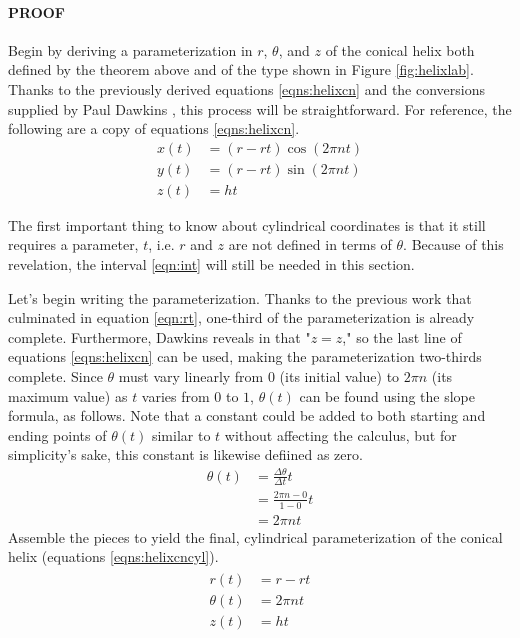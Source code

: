 \documentclass{article}
\begin{document}
\paragraph{PROOF} Begin by deriving a parameterization in $r$, $\theta$, and $z$ of the conical helix both defined by the theorem above and of the type shown in Figure \ref{fig:helixlab}. Thanks to the previously derived equations \ref{eqns:helixcn} and the conversions supplied by Paul Dawkins \cite{Bib:cylcords}, this process will be straightforward. For reference, the following are a copy of equations \ref{eqns:helixcn}.
\begin{align*}
    x(t) &= (r-rt)\cos(2\pi nt)\\
    y(t) &= (r-rt)\sin(2\pi nt)\\
    z(t) &= ht
\end{align*}\par
The first important thing to know about cylindrical coordinates is that it still requires a parameter, $t$, i.e. $r$ and $z$ are not defined in terms of $\theta$. Because of this revelation, the interval \ref{eqn:int} will still be needed in this section.\par
Let's begin writing the parameterization. Thanks to the previous work that culminated in equation \ref{eqn:rt}, one-third of the parameterization is already complete. Furthermore, Dawkins reveals in \cite{Bib:cylcords} that "$z=z$," so the last line of equations \ref{eqns:helixcn} can be used, making the parameterization two-thirds complete. Since $\theta$ must vary linearly from $0$ (its initial value) to $2\pi n$ (its maximum value) as $t$ varies from $0$ to $1$, $\theta(t)$ can be found using the slope formula, as follows. Note that a constant could be added to both starting and ending points of $\theta(t)$ similar to $t$ without affecting the calculus, but for simplicity's sake, this constant is likewise defiined as zero.
\begin{align*}
    \theta(t) &= \frac{\Delta\theta}{\Delta t}t\\
    &= \frac{2\pi n-0}{1-0}t\\
    &= 2\pi nt
\end{align*}
Assemble the pieces to yield the final, cylindrical parameterization of the conical helix (equations \ref{eqns:helixcncyl}).
\begin{align}\label{eqns:helixcncyl}
    \begin{split}
        r(t) &= r-rt\\
        \theta(t) &= 2\pi nt\\
        z(t) &= ht
    \end{split}
\end{align}\par
\end{document}
